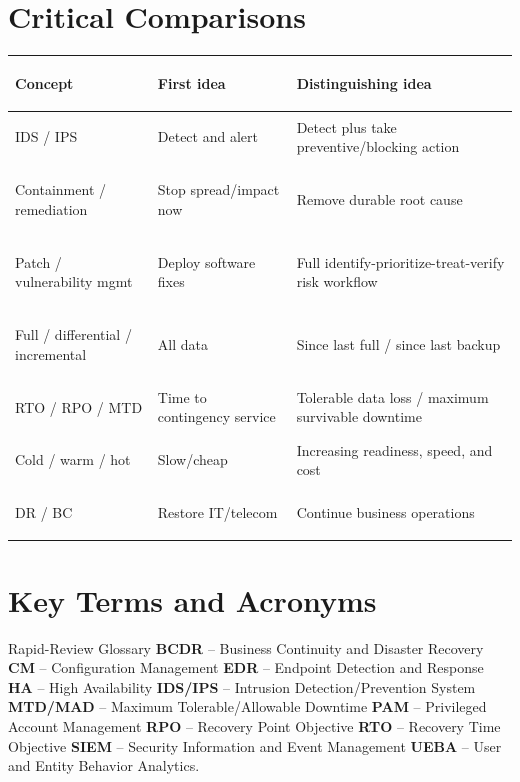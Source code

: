 \documentclass[10pt,letterpaper]{article}
\begin{document}
\section{Critical Comparisons}
\begin{center}\small
\begin{tabularx}{\textwidth}{>{\bfseries\color{Navy}\raggedright\arraybackslash}p{}>{\raggedright\arraybackslash}X>{\raggedright\arraybackslash}X}
\toprule Concept & First idea & Distinguishing idea\\\midrule
IDS / IPS & Detect and alert & Detect plus take preventive/blocking action\\
Containment / remediation & Stop spread/impact now & Remove durable root cause\\
Patch / vulnerability mgmt & Deploy software fixes & Full identify-prioritize-treat-verify risk workflow\\
Full / differential / incremental & All data & Since last full / since last backup\\
RTO / RPO / MTD & Time to contingency service & Tolerable data loss / maximum survivable downtime\\
Cold / warm / hot & Slow/cheap & Increasing readiness, speed, and cost\\
DR / BC & Restore IT/telecom & Continue business operations\\
\bottomrule
\end{tabularx}
\end{center}

\section{Key Terms and Acronyms}
\begin{summarybox}{Rapid-Review Glossary}
\textbf{BCDR} -- Business Continuity and Disaster Recovery \quad
\textbf{CM} -- Configuration Management \quad
\textbf{EDR} -- Endpoint Detection and Response \quad
\textbf{HA} -- High Availability \quad
\textbf{IDS/IPS} -- Intrusion Detection/Prevention System \quad
\textbf{MTD/MAD} -- Maximum Tolerable/Allowable Downtime \quad
\textbf{PAM} -- Privileged Account Management \quad
\textbf{RPO} -- Recovery Point Objective \quad
\textbf{RTO} -- Recovery Time Objective \quad
\textbf{SIEM} -- Security Information and Event Management \quad
\textbf{UEBA} -- User and Entity Behavior Analytics.
\end{summarybox}
\end{document}
